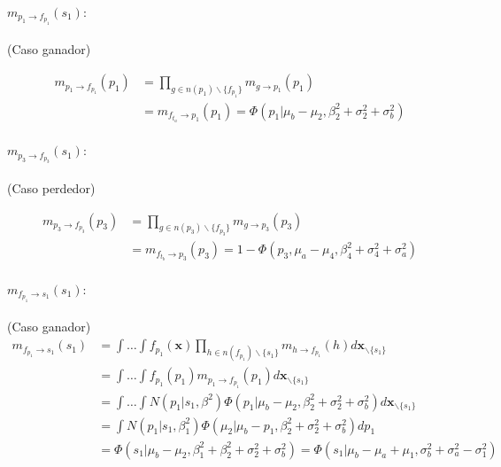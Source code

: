 \documentclass[11pt,twoside,spanish]{report} %
\begin{document}
\paragraph{$m_{p_1 \rightarrow f_{p_1}}(s_1):$} (Caso ganador)

\begin{equation}
	\begin{split}
		m_{p_1 \rightarrow f_{p_1}}(p_1) &= \prod_{g \in n(p_1) \backslash  \{f_{p_1} \}} m_{g \rightarrow p_1} (p_1) \\
		&=m_{f_{t_a} \rightarrow p_1}(p_1) =  \Phi(p_1| \mu_b - \mu_2, \beta_2^2 + \sigma_2^2 + \sigma_b^2)
	\end{split}
\end{equation}


\paragraph{$m_{p_3 \rightarrow f_{p_3}}(s_1):$} (Caso perdedor)

\begin{equation}
	\begin{split}
		m_{p_3 \rightarrow f_{p_3}}(p_3) &= \prod_{g \in n(p_3) \backslash  \{f_{p_3} \}} m_{g \rightarrow p_3} (p_3) \\
		&= m_{f_{t_b} \rightarrow p_3}(p_3)=  1 - \Phi(p_3, \mu_a  - \mu_4, \beta_4^2 + \sigma_4^2 + \sigma_a^2)
	\end{split}
\end{equation}

\paragraph{$m_{f_{p_1} \rightarrow s_1}(s_1):$} (Caso ganador)
\begin{equation}
	\begin{split}
		m_{f_{p_1} \rightarrow s_1}(s_1) & = \int \dots \int f_{p_1}(\textbf{x}) \prod_{h \in n(f_{p_1}) \backslash \{s_1\} } m_{h \rightarrow f_{p_1}}(h)  d\textbf{x}_{\backslash \{s_1\} }  \\
		&= \int \dots \int f_{p_1}(p_1)m_{p_1 \rightarrow f_{p_1}}(p_1) d\textbf{x}_{\backslash \{s_1\} }  \\
		&= \int \dots \int N(p_1| s_1, \beta^2)  \Phi(p_1| \mu_b - \mu_2, \beta_2^2 + \sigma_2^2 + \sigma_b^2 )  d\textbf{x}_{\backslash \{s_1\} }\\
		&= \int N(p_1| s_1, \beta_1^2)  \Phi(\mu_2| \mu_b -  p_1, \beta_2^2 + \sigma_2^2 + \sigma_b^2)  dp_1 \\
		&= \Phi(s_1| \mu_b - \mu_2, \beta_1^2+\beta_2^2 + \sigma_2^2 + \sigma_b^2) =\Phi(s_1| \mu_b - \mu_a + \mu_1, \sigma_b^2 +\sigma_a^2 - \sigma_1^2 )
	\end{split}
\end{equation}
\end{document}
